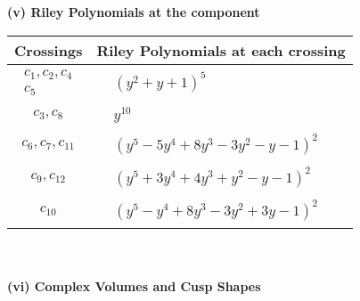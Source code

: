 \documentclass[1p]{elsarticle_modified}
\theoremstyle{definition}
\begin{document}
\newpage\renewcommand{\arraystretch}{1}
\flushleft \textbf{(v) Riley Polynomials at the component}\newline \\
\begin{tabular}{m{50pt}|m{274pt}}
Crossings & \hspace{64pt}Riley Polynomials at each crossing \\
\hline $$\begin{aligned}c_{1},c_{2},c_{4}\\c_{5}\end{aligned}$$&$\begin{aligned}
&(y^2+y+1)^5
\end{aligned}$\\
\hline $$\begin{aligned}c_{3},c_{8}\end{aligned}$$&$\begin{aligned}
&y^{10}
\end{aligned}$\\
\hline $$\begin{aligned}c_{6},c_{7},c_{11}\end{aligned}$$&$\begin{aligned}
&(y^5-5 y^4+8 y^3-3 y^2- y-1)^2
\end{aligned}$\\
\hline $$\begin{aligned}c_{9},c_{12}\end{aligned}$$&$\begin{aligned}
&(y^5+3 y^4+4 y^3+y^2- y-1)^2
\end{aligned}$\\
\hline $$\begin{aligned}c_{10}\end{aligned}$$&$\begin{aligned}
&(y^5- y^4+8 y^3-3 y^2+3 y-1)^2
\end{aligned}$\\
\hline
\end{tabular}\\~\\
\newpage\flushleft \textbf{(vi) Complex Volumes and Cusp Shapes}
\end{document}
